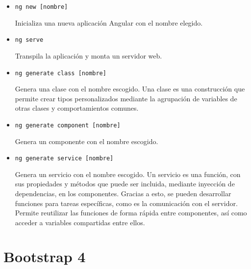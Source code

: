 \documentclass[openright,twoside,10pt]{book}
\begin{document}
    \begin{itemize}
    \item
      \texttt{ng\ new\ {[}nombre{]}}
    
      Inicializa una nueva aplicación Angular con el nombre elegido.
    \item
      \texttt{ng\ serve}
    
      Transpila la aplicación y monta un servidor web.
    \item
      \texttt{ng\ generate\ class\ {[}nombre{]}}
    
      Genera una clase con el nombre escogido. Una clase es una construcción
      que permite crear tipos personalizados mediante la agrupación de
      variables de otras clases y comportamientos comunes.
    \item
      \texttt{ng\ generate\ component\ {[}nombre{]}}
    
      Genera un componente con el nombre escogido.
    \item
      \texttt{ng\ generate\ service\ {[}nombre{]}}
    
      Genera un servicio con el nombre escogido. Un servicio es una función,
      con sus propiedades y métodos que puede ser incluida, mediante
      inyección de dependencias, en los componentes. Gracias a esto, se
      pueden desarrollar funciones para tareas específicas, como es la
      comunicación con el servidor. Permite reutilizar las funciones de
      forma rápida entre componentes, así como acceder a variables
      compartidas entre ellos.
    \end{itemize}
    
    \section{Bootstrap 4}\label{bootstrap-4}
    
\end{document}

